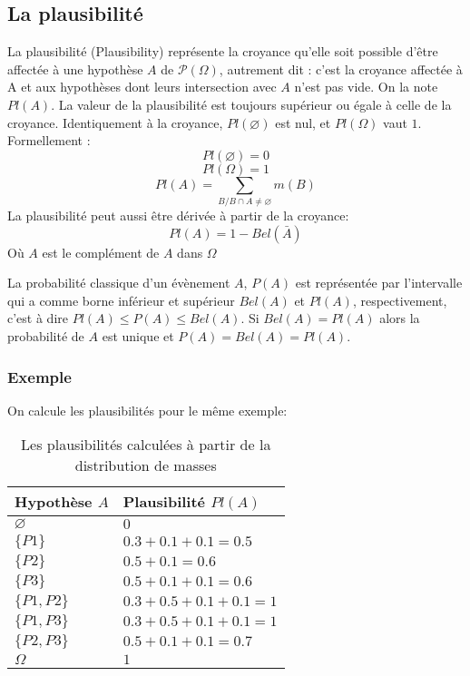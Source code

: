 \subsection{La plausibilité}

La plausibilité (Plausibility) représente la croyance qu’elle soit possible
d’être affectée à une hypothèse $A$ de $\mathcal{P}(\Omega)$, autrement dit
: c’est la croyance affectée à A et aux hypothèses dont leurs intersection
avec $A$ n’est pas vide. On la note $Pl(A)$. La valeur de la plausibilité est
toujours supérieur ou égale à celle de la croyance. Identiquement à la
croyance, $Pl(\varnothing)$ est nul, et $Pl(\Omega)$ vaut $1$.\\
Formellement :
\begin{equation}
Pl(\varnothing) = 0
\end{equation}
\begin{equation}
Pl(\Omega) = 1
\end{equation}
\begin{equation}
Pl(A) = \sum_{B \slash B \cap A \neq \varnothing} m(B)
\end{equation}
La plausibilité peut aussi être dérivée à partir de la croyance:
\begin{equation}
Pl(A) = 1 - Bel(\bar{A})
\end{equation}
Où $A$ est le complément de $A$ dans $\Omega$

La probabilité classique d’un évènement $A$, $P(A)$ est représentée par
l’intervalle qui a comme borne inférieur et supérieur $Bel(A)$ et $Pl(A)$,
respectivement, c’est à dire $Pl(A) \leq P(A) \leq Bel(A)$. Si $Bel(A) = Pl(A)$
alors la probabilité de $A$ est unique et $P(A) = Bel(A) = Pl(A)$.

\subsubsection{Exemple}
On calcule les plausibilités pour le même exemple:

\begin{table}[h]
\begin{center}
\begin{tabular}{|l|l|}
\hline
Hypothèse $A$ & Plausibilité $Pl(A)$\\
\hline
$\varnothing$ & $0$ \\
\hline
$\{P1\}$ & $0.3 + 0.1 + 0.1 = 0.5$ \\
\hline
$\{P2\}$ & $0.5 + 0.1 = 0.6$ \\
\hline
$\{P3\}$ & $0.5 + 0.1 + 0.1 = 0.6$ \\
\hline
$\{P1, P2\}$ & $0.3 + 0.5 + 0.1 + 0.1 = 1$ \\
\hline
$\{P1, P3\}$ & $0.3 + 0.5 + 0.1 + 0.1 = 1$ \\
\hline
$\{P2, P3\}$ & $0.5 + 0.1 + 0.1 = 0.7$ \\
\hline
$\Omega$ & $1$ \\
\hline
\end{tabular}
\caption{Les plausibilités calculées à partir de la distribution de masses}
\end{center}
\end{table}
